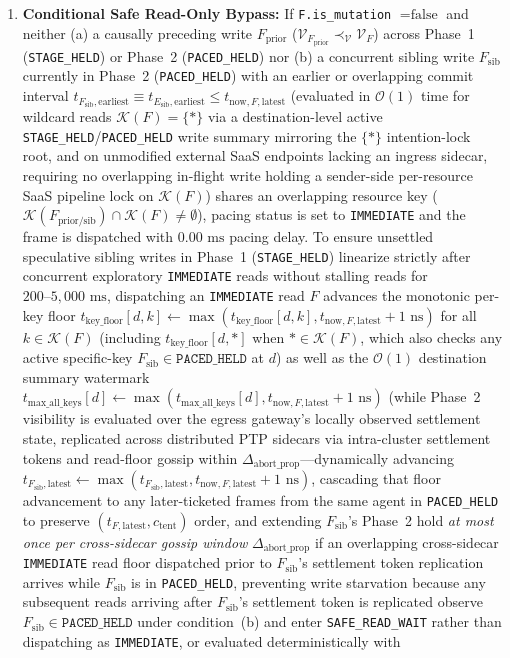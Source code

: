 \documentclass[conference,10pt]{IEEEtran}
\begin{document}
\begin{enumerate}
    \item \textbf{Conditional Safe Read-Only Bypass:} If \texttt{F.is\_mutation} $= \text{false}$ and neither (a) a causally preceding write $F_{\text{prior}}$ ($\mathcal{V}_{F_{\text{prior}}} \prec_{\mathcal{V}} \mathcal{V}_F$) across Phase~1 (\texttt{STAGE\_HELD}) or Phase~2 (\texttt{PACED\_HELD}) nor (b) a concurrent sibling write $F_{\text{sib}}$ currently in Phase~2 (\texttt{PACED\_HELD}) with an earlier or overlapping commit interval $t_{F_{\text{sib}},\text{earliest}} \equiv t_{E_{\text{sib}},\text{earliest}} \le t_{\text{now},F,\text{latest}}$ (evaluated in $\mathcal{O}(1)$ time for wildcard reads $\mathcal{K}(F) = \{\texttt{*}\}$ via a destination-level active \texttt{STAGE\_HELD}/\texttt{PACED\_HELD} write summary mirroring the $\{\texttt{*}\}$ intention-lock root, and on unmodified external SaaS endpoints lacking an ingress sidecar, requiring no overlapping in-flight write holding a sender-side per-resource SaaS pipeline lock on $\mathcal{K}(F)$) shares an overlapping resource key ($\mathcal{K}(F_{\text{prior/sib}}) \cap \mathcal{K}(F) \ne \emptyset$), pacing status is set to \texttt{IMMEDIATE} and the frame is dispatched with $0.00\text{ ms}$ pacing delay. To ensure unsettled speculative sibling writes in Phase~1 (\texttt{STAGE\_HELD}) linearize strictly after concurrent exploratory \texttt{IMMEDIATE} reads without stalling reads for $200\text{--}5{,}000\text{ ms}$, dispatching an \texttt{IMMEDIATE} read $F$ advances the monotonic per-key floor $t_{\text{key\_floor}}[d, k] \leftarrow \max(t_{\text{key\_floor}}[d, k], t_{\text{now},F,\text{latest}} + 1\text{ ns})$ for all $k \in \mathcal{K}(F)$ (including $t_{\text{key\_floor}}[d, \texttt{*}]$ when $\texttt{*} \in \mathcal{K}(F)$, which also checks any active specific-key $F_{\text{sib}} \in \texttt{PACED\_HELD}$ at $d$) as well as the $\mathcal{O}(1)$ destination summary watermark $t_{\text{max\_all\_keys}}[d] \leftarrow \max(t_{\text{max\_all\_keys}}[d], t_{\text{now},F,\text{latest}} + 1\text{ ns})$ (while Phase~2 visibility is evaluated over the egress gateway's locally observed settlement state, replicated across distributed PTP sidecars via intra-cluster settlement tokens and read-floor gossip within $\Delta_{\text{abort\_prop}}$---dynamically advancing $t_{F_{\text{sib}},\text{latest}} \leftarrow \max(t_{F_{\text{sib}},\text{latest}}, t_{\text{now},F,\text{latest}} + 1\text{ ns})$, cascading that floor advancement to any later-ticketed frames from the same agent in \texttt{PACED\_HELD} to preserve $(t_{F,\text{latest}}, c_{\text{tent}})$ order, and extending $F_{\text{sib}}$'s Phase~2 hold \emph{at most once per cross-sidecar gossip window} $\Delta_{\text{abort\_prop}}$ if an overlapping cross-sidecar \texttt{IMMEDIATE} read floor dispatched prior to $F_{\text{sib}}$'s settlement token replication arrives while $F_{\text{sib}}$ is in \texttt{PACED\_HELD}, preventing write starvation because any subsequent reads arriving after $F_{\text{sib}}$'s settlement token is replicated observe $F_{\text{sib}} \in \texttt{PACED\_HELD}$ under condition~(b) and enter \texttt{SAFE\_READ\_WAIT} rather than dispatching as \texttt{IMMEDIATE}, or evaluated deterministically with 
\end{enumerate}
\end{document}
